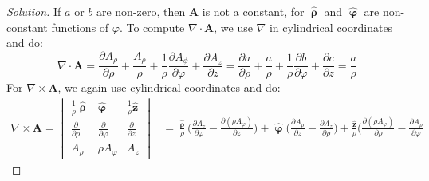 \documentclass[crop=false,class=article,oneside]{standalone}
\begin{document}
        \begin{proof}[Solution]
            If $a$ or $b$ are non-zero, then $\mathbf{A}$
            is not a constant, for
            $\hat{\boldsymbol{\uprho}}$ and
            $\hat{\boldsymbol{\upvarphi}}$ are
            non-constant functions of $\varphi$. To compute
            $\nabla\cdot\mathbf{A}$, we use $\nabla$ in
            cylindrical coordinates and do:
            \begin{equation*}
                \nabla\cdot\mathbf{A}
                =\frac{\partial{A_{\rho}}}{\partial\rho}
                +\frac{A_{\rho}}{\rho}
                +\frac{1}{\rho}
                 \frac{\partial{A_{\phi}}}{\partial\varphi}
                +\frac{\partial{A_{z}}}{\partial{z}}
                =\frac{\partial{a}}{\partial\rho}
                +\frac{a}{\rho}
                +\frac{1}{\rho}
                 \frac{\partial{b}}{\partial\varphi}
                +\frac{\partial{c}}{\partial{z}}
                =\frac{a}{\rho}
            \end{equation*}
            For $\nabla\times\mathbf{A}$,
            we again use cylindrical coordinates and do:
            \begin{align*}
                \nabla\times\mathbf{A}
                =
                \begin{vmatrix}
                    \frac{1}{\rho}\hat{\boldsymbol{\uprho}}
                    &\hat{\boldsymbol{\upvarphi}}
                    &\frac{1}{\rho}\hat{\mathbf{z}}\\
                    \frac{\partial}{\partial\rho}
                    &\frac{\partial}{\partial\varphi}
                    &\frac{\partial}{\partial{z}}\\
                    A_{\rho}
                    &\rho{A_{\varphi}}
                    &A_{z}
                \end{vmatrix}
                &=\frac{\hat{\boldsymbol{\uprho}}}{\rho}\bigg(
                    \frac{\partial{A_{z}}}{\partial\varphi}
                    -\frac{\partial(\rho{A_{\varphi}})}
                          {\partial{z}}
                \bigg)
                +\hat{\boldsymbol{\upvarphi}}\bigg(
                    \frac{\partial{A_{\rho}}}{\partial{z}}
                    -\frac{\partial{A_{z}}}{\partial\rho}
                \bigg)
                +\frac{\hat{\mathbf{z}}}{\rho}\bigg(
                    \frac{\partial(\rho{A_{\varphi}})}
                         {\partial\rho}
                    -\frac{\partial{A_{\rho}}}
                          {\partial\varphi}

\end{align*}
\end{proof}
\end{document}
